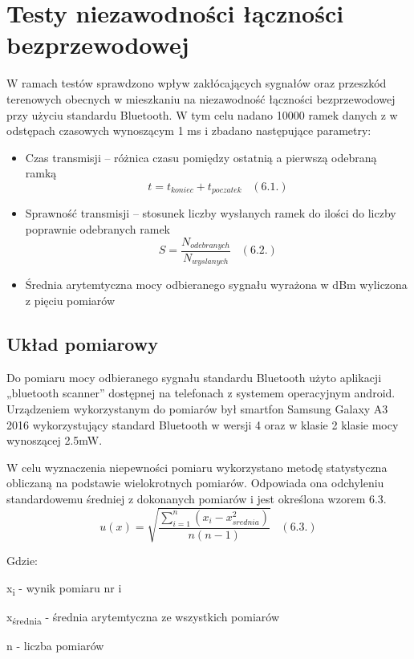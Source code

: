 \documentclass[12pt, twoside, openany]{mwrep}
\begin{document}
\section{Testy niezawodności łączności bezprzewodowej}
W ramach testów sprawdzono wpływ zakłócających sygnałów oraz przeszkód terenowych obecnych w mieszkaniu na niezawodność łączności bezprzewodowej przy użyciu standardu Bluetooth. W tym celu nadano 10000 ramek danych z w odstępach czasowych wynoszącym 1 ms i zbadano następujące parametry:

\begin{itemize}
\item Czas transmisji – różnica czasu pomiędzy ostatnią a pierwszą odebraną ramką \[ t = t_{koniec} + t_{poczatek} \; \; \;  (6.1.)\]
\item	Sprawność transmisji – stosunek liczby wysłanych ramek do ilości do liczby poprawnie odebranych ramek \[ S = \frac{N_{odebranych}}{N_{wyslanych}} \; \; \;  (6.2.)\]
\item	Średnia arytemtyczna mocy odbieranego sygnału wyrażona w dBm wyliczona z pięciu pomiarów
\end{itemize}

\subsection{Układ pomiarowy}
Do pomiaru mocy odbieranego sygnału standardu Bluetooth użyto aplikacji „bluetooth scanner” dostępnej na telefonach z systemem operacyjnym android. Urządzeniem wykorzystanym do pomiarów był smartfon Samsung Galaxy A3 2016 wykorzystujący standard Bluetooth w wersji 4 oraz w klasie 2 klasie mocy wynoszącej 2.5mW.
\par
W celu wyznaczenia niepewności pomiaru wykorzystano metodę statystyczna obliczaną na podstawie wielokrotnych pomiarów. Odpowiada ona odchyleniu standardowemu średniej z dokonanych pomiarów i jest określona wzorem 6.3.
\[ u(x) = \sqrt{ \frac{ \sum_{i=1}^{n} (x_i -x_{srednia}^2) } { n(n-1)  }}  \; \; \;  (6.3.)\]
\par
Gdzie: \par
 x\textsubscript{i}  - wynik pomiaru nr i 
\par
 x\textsubscript{średnia}  - średnia arytemtyczna ze wszystkich pomiarów
\par
 n - liczba pomiarów

\end{document}

